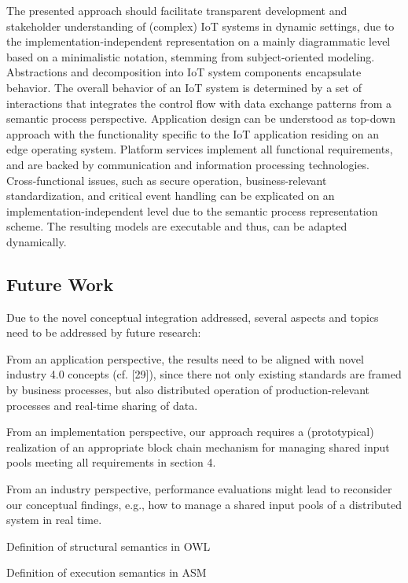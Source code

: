 The presented approach should facilitate transparent development and stakeholder understanding of (complex) IoT systems in dynamic settings, due to the implementation-independent representation on a mainly diagrammatic level based on a minimalistic notation, stemming from subject-oriented modeling. Abstractions and decomposition into IoT system components encapsulate behavior. The overall behavior of an IoT system is determined by a set of interactions that integrates the control flow with data exchange patterns from a semantic process perspective. Application design can be understood as top-down approach with the functionality specific to the IoT application residing on an edge operating system. Platform services implement all functional requirements, and are backed by communication and information processing technologies. Cross-functional issues, such as secure operation, business-relevant standardization, and critical event handling can be explicated on an implementation-independent level due to the semantic process representation scheme. The resulting models are executable and thus, can be adapted dynamically.


\subsection{Future Work}
Due to the novel conceptual integration addressed, several aspects and topics need to be addressed by future research:
\begin{list}{-}{spacing}
\item From an application perspective, the results need to be aligned with novel industry 4.0 concepts (cf. [29]), since there not only existing standards are framed by business processes, but also distributed operation of production-relevant processes and real-time sharing of data.
\item From an implementation perspective, our approach requires a (prototypical) realization of an appropriate block chain mechanism for managing shared input pools meeting all requirements in section 4.
\item From an industry perspective, performance evaluations might lead to reconsider our conceptual findings, e.g., how to manage a shared input pools of a distributed system in real time.
\item Definition of structural semantics in OWL
\item Definition of execution semantics in ASM
\end{list}

